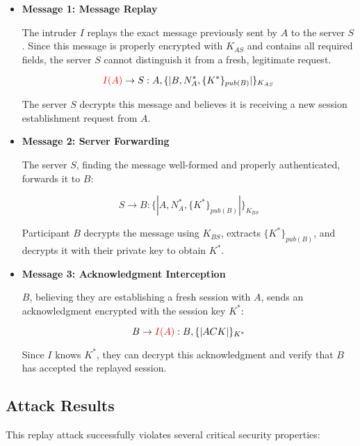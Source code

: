 \documentclass[11pt]{article}
\begin{document}
    \begin{itemize}
        \item \textbf{Message 1: Message Replay}

        The intruder $I$ replays the exact message previously sent by $A$ to the server $S$. Since this message is properly encrypted with $K_{AS}$ and contains all required fields, the server $S$ cannot distinguish it from a fresh, legitimate request.

        \[
            \textcolor{red}{I(A)} \rightarrow S : A, \{| B, N_A^*, \{K^*\}_{pub(B)} |\}_{K_{AS}}
        \]

        The server $S$ decrypts this message and believes it is receiving a new session establishment request from $A$.
        \item \textbf{Message 2: Server Forwarding}

        The server $S$, finding the message well-formed and properly authenticated, forwards it to $B$:

        \[
            S \rightarrow B : \{| A, N_A^*, \{K^*\}_{pub(B)} |\}_{K_{BS}}
        \]

        Participant $B$ decrypts the message using $K_{BS}$, extracts $\{K^*\}_{pub(B)}$, and decrypts it with their private key to obtain $K^*$.

        \item \textbf{Message 3: Acknowledgment Interception}

        $B$, believing they are establishing a fresh session with $A$, sends an acknowledgment encrypted with the session key $K^*$:

        \[
            B \rightarrow \textcolor{red}{I(A)} : B, \{| ACK |\}_{K^*}
        \]

        Since $I$ knows $K^*$, they can decrypt this acknowledgment and verify that $B$ has accepted the replayed session.

    \end{itemize}




    \subsection{Attack Results}



    This replay attack successfully violates several critical security properties:
\end{document}
